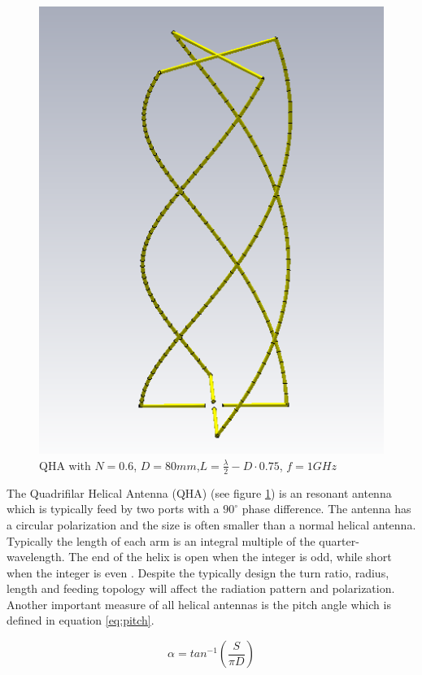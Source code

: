 \begin{figure}[H]
\centering 
\includegraphics[scale = 0.7]{figures/antennas/qha/qha_6_1mhz}
\caption{QHA with $N=0.6$, $D=80mm$,$L=\frac{\lambda}{2}-D\cdot 0.75$, $f=1GHz$}
\label{fig:QHA1}
\end{figure}

The Quadrifilar Helical Antenna (QHA) (see figure \ref{fig:QHA1}) is an resonant antenna which is typically feed by two ports with a $90^\circ$ phase difference. The antenna has a circular polarization and the size is often smaller than a normal helical antenna. Typically the length of each arm is an integral multiple of the quarter-wavelength. The end of the helix
is open when the integer is odd, while short when the integer is
even \citep{Bai2014}. Despite the typically design the turn ratio, radius, length and feeding topology will affect the radiation pattern and polarization. Another important measure of all helical antennas is the pitch angle which is defined in equation \ref{eq:pitch}.

\begin{equation}
\alpha = tan^{-1}(\frac{S}{\pi D})
\end{equation}
\label{eq:pitch}

